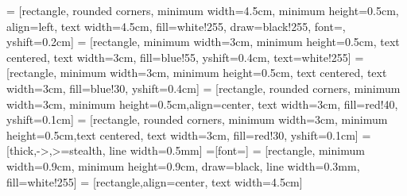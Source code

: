 \documentclass[]{article}
\begin{document}

 = [rectangle, rounded corners, minimum width=4.5cm, minimum height=0.5cm, align=left, text width=4.5cm, fill=white!255, draw=black!255, font=\small, yshift=0.2cm]
 = [rectangle, minimum width=3cm, minimum height=0.5cm, text centered, text width=3cm, fill=blue!55, yshift=0.4cm, text=white!255]
 = [rectangle, minimum width=3cm, minimum height=0.5cm, text centered, text width=3cm, fill=blue!30, yshift=0.4cm]
 = [rectangle, rounded corners, minimum width=3cm, minimum height=0.5cm,align=center, text width=3cm, fill=red!40, yshift=0.1cm]
 = [rectangle, rounded corners, minimum width=3cm, minimum height=0.5cm,text centered, text width=3cm, fill=red!30, yshift=0.1cm]
 = [thick,->,>=stealth, line width=0.5mm]
=[font=\scriptsize]
 = [rectangle, minimum width=0.9cm, minimum height=0.9cm, draw=black, line width=0.3mm, fill=white!255]
 = [rectangle,align=center, text width=4.5cm]
\end{document}
